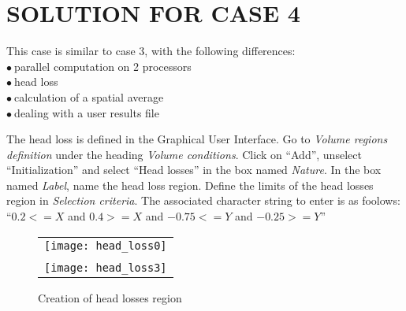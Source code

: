 %
%
%
%
%
%
%
\section{SOLUTION FOR CASE 4}
This case is similar to case 3, with the following differences:\\
\hspace*{1cm}$\bullet\ $parallel computation on 2 processors\\
\hspace*{1cm}$\bullet\ $head loss\\
\hspace*{1cm}$\bullet\ $calculation of a spatial average\\
\hspace*{1cm}$\bullet\ $dealing with a user results file

The head loss is defined in the Graphical User Interface. Go to {\itshape Volume regions definition} under the heading {\itshape Volume conditions}. Click on ``Add'', unselect ``Initialization'' and select ``Head losses'' in the box named {\itshape Nature}. In the box named {\itshape Label}, name the head loss region. Define the limits of the head losses region in {\itshape Selection criteria}. The associated character string to enter is as foolows:
``$0.2 <= X$ and $0.4 >= X$ and $-0.75 <= Y$ and $-0.25 >= Y$''

\begin{figure}[h!]
\begin{center}
\begin{tabular}{c}
\texttt{[image: head\_loss0]} \\
\\
\texttt{[image: head\_loss3]}
\end{tabular}
\caption{Creation of head losses region}
\label{fig_hl1}
\end{center}
\end{figure}

